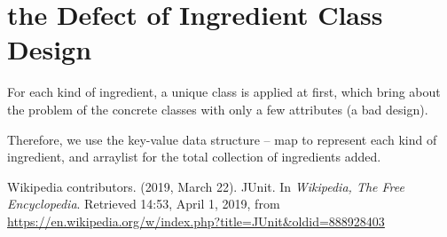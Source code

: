 \documentclass[a4paper]{report}
\begin{document}
\section{the Defect of Ingredient Class Design}
For each kind of ingredient, a unique class is applied at first, which bring about the problem of the concrete classes with only a few attributes (a bad design). 
\par Therefore, we use the key-value data structure -- map to represent each kind of ingredient, and arraylist for the total collection of ingredients added.

\begin{thebibliography}{A}


Wikipedia contributors. (2019, March 22). JUnit. In \emph{Wikipedia, The Free Encyclopedia}. Retrieved 14:53, April 1, 2019, from \url{https://en.wikipedia.org/w/index.php?title=JUnit&oldid=888928403}

\end{thebibliography}
\end{document}
